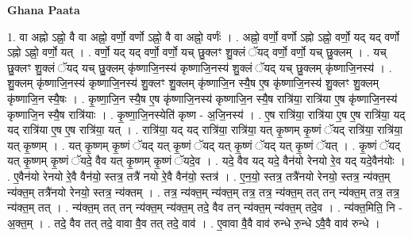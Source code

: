 \documentclass[17pt]{extarticle}
\begin{document}
\textbf{Ghana Paata } \newline

1. वा अह्नो ऽह्नो॒ वै वा अह्नो॒ वर्णो॒ वर्णो ऽह्नो॒ वै वा अह्नो॒ वर्णः॑ । . अह्नो॒ वर्णो॒ वर्णो ऽह्नो ऽह्नो॒ वर्णो॒ यद् यद् वर्णो ऽह्नो ऽह्नो॒ वर्णो॒ यत् । . वर्णो॒ यद् यद् वर्णो॒ वर्णो॒ यच् छु॒क्लꣳ शु॒क्लं ॅयद् वर्णो॒ वर्णो॒ यच् छु॒क्लम् । . यच् छु॒क्लꣳ शु॒क्लं ॅयद् यच् छु॒क्लम् कृ॑ष्णाजि॒नस्य॑ कृष्णाजि॒नस्य॑ शु॒क्लं ॅयद् यच् छु॒क्लम् कृ॑ष्णाजि॒नस्य॑ । . शु॒क्लम् कृ॑ष्णाजि॒नस्य॑ कृष्णाजि॒नस्य॑ शु॒क्लꣳ शु॒क्लम् कृ॑ष्णाजि॒न स्यै॒ष ए॒ष कृ॑ष्णाजि॒नस्य॑ शु॒क्लꣳ शु॒क्लम् कृ॑ष्णाजि॒न स्यै॒षः । . कृ॒ष्णा॒जि॒न स्यै॒ष ए॒ष कृ॑ष्णाजि॒नस्य॑ कृष्णाजि॒न स्यै॒ष रात्रि॑या॒ रात्रि॑या ए॒ष कृ॑ष्णाजि॒नस्य॑ कृष्णाजि॒न स्यै॒ष रात्रि॑याः । . कृ॒ष्णा॒जि॒नस्येति॑ कृष्ण - अ॒जि॒नस्य॑ । . ए॒ष रात्रि॑या॒ रात्रि॑या ए॒ष ए॒ष रात्रि॑या॒ यद् यद् रात्रि॑या ए॒ष ए॒ष रात्रि॑या॒ यत् । . रात्रि॑या॒ यद् यद् रात्रि॑या॒ रात्रि॑या॒ यत् कृ॒ष्णम् कृ॒ष्णं ॅयद् रात्रि॑या॒ रात्रि॑या॒ यत् कृ॒ष्णम् । . यत् कृ॒ष्णम् कृ॒ष्णं ॅयद् यत् कृ॒ष्णं ॅयद् यत् कृ॒ष्णं ॅयद् यत् कृ॒ष्णं ॅयत् । . कृ॒ष्णं ॅयद् यत् कृ॒ष्णम् कृ॒ष्णं ॅयदे॒ वैव यत् कृ॒ष्णम् कृ॒ष्णं ॅयदे॒व । . यदे॒ वैव यद् यदे॒ वैन॑यो रेनयो रे॒व यद् यदे॒वैन॑योः । . ए॒वैन॑यो रेनयो रे॒वै वैन॑यो॒ स्तत्र॒ तत्रै॑ नयो रे॒वै वैन॑यो॒ स्तत्र॑ । . ए॒न॒यो॒ स्तत्र॒ तत्रै॑नयो रेनयो॒ स्तत्र॒ न्य॑क्त॒म् न्य॑क्त॒म् तत्रै॑नयो रेनयो॒ स्तत्र॒ न्य॑क्तम् । . तत्र॒ न्य॑क्त॒म् न्य॑क्त॒म् तत्र॒ तत्र॒ न्य॑क्त॒म् तत् तन् न्य॑क्त॒म् तत्र॒ तत्र॒ न्य॑क्त॒म् तत् । . न्य॑क्त॒म् तत् तन् न्य॑क्त॒म् न्य॑क्त॒म् तदे॒ वैव तन् न्य॑क्त॒म् न्य॑क्त॒म् तदे॒व । . न्य॑क्त॒मिति॒ नि - अ॒क्त॒म् । . तदे॒ वैव तत् तदे॒ वावा वै॒व तत् तदे॒ वाव॑ । . ए॒वावा वै॒वै वाव॑ रुन्धे रु॒न्धे ऽवै॒वै वाव॑ रुन्धे । \newline
\end{document}

